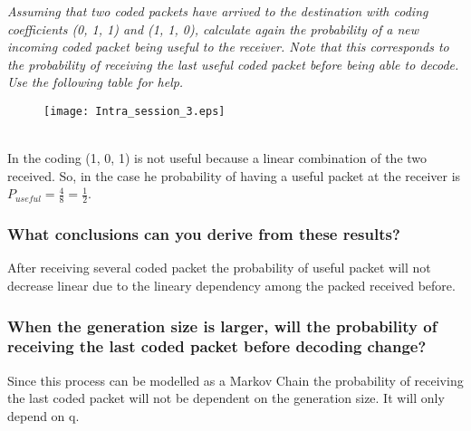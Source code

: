 \textit{Assuming that two coded packets have arrived to the destination with coding coefficients (0, 1, 1) and (1, 1, 0), calculate again the probability of a new incoming coded packet being useful to the receiver. Note that this corresponds to the probability of receiving the last useful coded packet before being able to decode. Use the following table for help.}\\
\begin{figure}[!h]
  \centering
  \texttt{[image: Intra\_session\_3.eps]}
  \caption{}
  \label{fig:Intra_session_3}
\end{figure}\\

In  the coding (1, 0, 1) is not useful because a linear combination of the two received. So, in the case he probability of having a useful packet at the receiver is $P_{useful}=\frac{4}{8}=\frac{1}{2}$.\\
\newpage
\subsubsection{What conclusions can you derive from these results?}
After receiving several coded packet the probability of useful packet will not decrease linear due to the lineary dependency among the packed received before. 

\subsubsection{When the generation size is larger, will the probability of receiving the last coded packet before decoding change?}

Since this process can be modelled as a Markov Chain the probability of receiving the last coded packet will not be dependent on the generation size. It will only depend on q.

